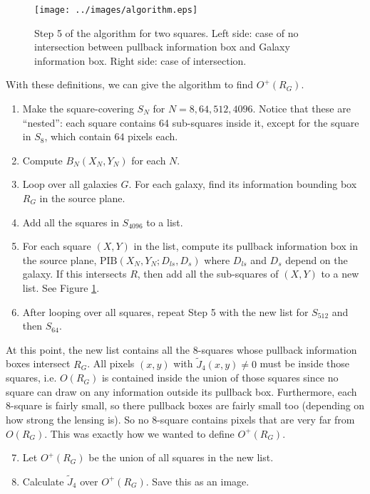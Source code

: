 \documentclass[10pt,twoside]{article}
\theoremstyle{definition}
\theoremstyle{exercise}
\begin{document}
\begin{figure}[h]
		\begin{center}
				\texttt{[image: ../images/algorithm.eps]}
		\end{center}
		\caption{Step 5 of the algorithm for two squares. Left side: case of no intersection between pullback information box and Galaxy information box. Right side: case of intersection.}
		\label{fig:algorithm}
\end{figure}

With these definitions, we can give the algorithm to find $O^+(R_G)$.
\begin{enumerate}
  \item Make the square-covering $S_N$ for $N = 8, 64, 512, 4096$. Notice that these are ``nested'': each square contains 64 sub-squares inside it, except for the square in $S_8$, which contain $64$ pixels each.
  \item Compute $B_N(X_N,Y_N)$ for each $N$. 
  \item Loop over all galaxies $G$. For each galaxy, find its information bounding box $R_G$ in the source plane.
  \item Add all the squares in $S_{4096}$ to a list.
  \item For each square $(X,Y)$ in the list, compute its pullback information box in the source plane, $\text{PIB}(X_N,Y_N; D_{ls}, D_{s})$ where $D_{ls}$ and $D_{s}$ depend on the galaxy. If this intersects $R$, then add all the sub-squares of $(X,Y)$ to a new list. See Figure \ref{fig:algorithm}.
  \item After looping over all squares, repeat Step 5 with the new list for $S_{512}$ and then $S_{64}$.
\end{enumerate}
At this point, the new list contains all the $8$-squares whose pullback information boxes intersect $R_G$. All pixels $(x,y)$ with $\tilde{J}_4(x,y) \neq 0$ must be inside those squares, i.e. $O(R_G)$ is contained inside the union of those squares since no square can draw on any information outside its pullback box. Furthermore, each 8-square is fairly small, so there pullback boxes are fairly small too (depending on how strong the lensing is). So no 8-square contains pixels that are very far from $O(R_G)$. This was exactly how we wanted to define $O^+(R_G)$.
\begin{enumerate}
    \setcounter{enumi}{6}
    \item Let $O^+(R_G)$ be the union of all squares in the new list.
    \item Calculate $\tilde{J}_4$ over $O^+(R_G)$. Save this as an image. 
\end{enumerate}
\end{document}
